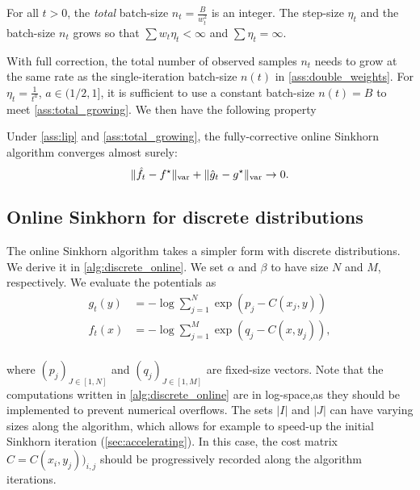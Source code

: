 \begin{assumption}\label{ass:total_growing}
    For all $t > 0$, the \textit{total} batch-size $n_t = \frac{B}{w_t^2}$ is an
        integer. The step-size $\eta_t$ and the batch-size $n_t$ grows so that
        $\sum w_t \eta_t < \infty$ and $\sum \eta_t = \infty$.
\end{assumption}

With full correction, the total number of observed samples $n_t$ needs to grow
at the same rate as the single-iteration batch-size $n(t)$ in
\autoref{ass:double_weights}. For $\eta_t = \frac{1}{t^a}$, $a \in (1/2, 1]$, it
is sufficient to use a constant batch-size $n(t) = B$ to meet \autoref{ass:total_growing}. We then have the following property

\begin{proposition}
    Under \autoref{ass:lip} and
    \ref{ass:total_growing}, the fully-corrective online Sinkhorn algorithm converges almost surely:
    \begin{equation}
        \Vert \hat f_t - f^\star \Vert_{\text{\upshape var}} + \Vert \hat g_t - g^\star \Vert_{\text{\upshape var}} \to 0.
    \end{equation}
\end{proposition}



\subsection{Online Sinkhorn for discrete distributions}\label{sec:sinkhorn_discrete}

The online Sinkhorn algorithm takes a simpler form with discrete
distributions. We derive it in \autoref{alg:discrete_online}. We set $\alpha$
and $\beta$ to have size $N$ and $M$, respectively. We evaluate
the potentials as
\begin{align}
    g_t(y) &= - \log \sum_{j=1}^N \exp(p_j - C(x_j, y)) \\
    f_t(x) &= - \log \sum_{j=1}^M \exp(q_j - C(x, y_j)), \\
\end{align}

\vspace{-2em}
where $(p_j)_{J \in [1, N]}$ and $(q_j)_{J \in [1, M]}$ are fixed-size vectors.
Note that the computations written in \autoref{alg:discrete_online} are
in log-space,as they should be implemented to prevent numerical overflows. The sets $|I|$ and $|J|$ can
have varying sizes along the algorithm, which allows for example to speed-up the
initial Sinkhorn iteration (\autoref{sec:accelerating}). In this case, the
cost matrix $\hat C = C(x_i,y_j))_{i,j}$ should be progressively recorded along the algorithm iterations.

